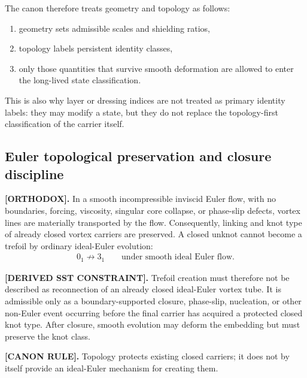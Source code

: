 \documentclass[11pt]{article}
\theoremstyle{definition}
\theoremstyle{plain}
\theoremstyle{remark}
\begin{document}
        The canon therefore treats geometry and topology as follows:
        \begin{enumerate}
            \item geometry sets admissible scales and shielding ratios,
            \item topology labels persistent identity classes,
            \item only those quantities that survive smooth deformation are allowed to enter the long-lived state classification.
        \end{enumerate}

        This is also why layer or dressing indices are not treated as primary identity labels: they may modify a state, but they do not replace the topology-first classification of the carrier itself.

    \subsection{Euler topological preservation and closure discipline}
        \label{subsec:euler_topological_preservation_closure}

        \textbf{[ORTHODOX].}
        In a smooth incompressible inviscid Euler flow, with no boundaries, forcing,
        viscosity, singular core collapse, or phase-slip defects, vortex lines are
        materially transported by the flow. Consequently, linking and knot type of
        already closed vortex carriers are preserved. A closed unknot cannot become
        a trefoil by ordinary ideal-Euler evolution:
        \begin{align}
            0_1 \not\longrightarrow 3_1
            \qquad
            \text{under smooth ideal Euler flow.}
            \label{eq:euler_no_unknot_to_trefoil}
        \end{align}

        \textbf{[DERIVED SST CONSTRAINT].}
        Trefoil creation must therefore not be described as reconnection of an
        already closed ideal-Euler vortex tube. It is admissible only as a
        boundary-supported closure, phase-slip, nucleation, or other non-Euler
        event occurring before the final carrier has acquired a protected closed
        knot type. After closure, smooth evolution may deform the embedding but
        must preserve the knot class.

        \textbf{[CANON RULE].}
        Topology protects existing closed carriers; it does not by itself provide
        an ideal-Euler mechanism for creating them.
\end{document}
